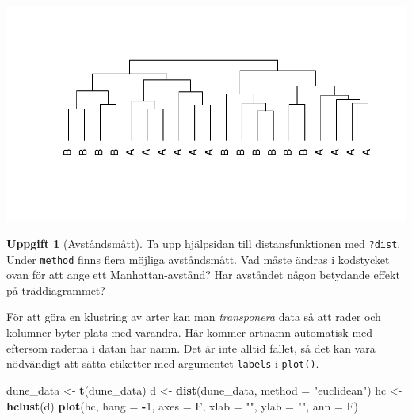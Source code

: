 \documentclass[
]{book}
\newenvironment{Shaded}{\begin{snugshade}}{\end{snugshade}}
\newcommand{\AttributeTok}[1]{\textcolor[rgb]{0.13,0.29,0.53}{#1}}
\newcommand{\DecValTok}[1]{\textcolor[rgb]{0.00,0.00,0.81}{#1}}
\newcommand{\FunctionTok}[1]{\textcolor[rgb]{0.13,0.29,0.53}{\textbf{#1}}}
\newcommand{\NormalTok}[1]{#1}
\newcommand{\OtherTok}[1]{\textcolor[rgb]{0.56,0.35,0.01}{#1}}
\newcommand{\SpecialCharTok}[1]{\textcolor[rgb]{0.81,0.36,0.00}{\textbf{#1}}}
\newcommand{\StringTok}[1]{\textcolor[rgb]{0.31,0.60,0.02}{#1}}
\theoremstyle{definition}
\theoremstyle{definition}
\theoremstyle{definition}
\newtheorem{exercise}{Uppgift}[chapter]
\theoremstyle{definition}
\theoremstyle{remark}
\begin{document}
\begin{center}\includegraphics{R-anvisningar_files/figure-latex/unnamed-chunk-253-1} \end{center}

\begin{exercise}[Avståndsmått]
Ta upp hjälpsidan till distansfunktionen med \texttt{?dist}. Under \texttt{method} finns flera möjliga avståndsmått. Vad måste ändras i kodstycket ovan för att ange ett Manhattan-avstånd? Har avståndet någon betydande effekt på träddiagrammet?
\end{exercise}

För att göra en klustring av arter kan man \emph{transponera} data så att rader och kolumner byter plats med varandra. Här kommer artnamn automatisk med eftersom raderna i datan har namn. Det är inte alltid fallet, så det kan vara nödvändigt att sätta etiketter med argumentet \texttt{labels} i \texttt{plot()}.

\begin{Shaded}
\begin{Highlighting}[]
\NormalTok{dune\_data }\OtherTok{\textless{}{-}} \FunctionTok{t}\NormalTok{(dune\_data)}
\NormalTok{d }\OtherTok{\textless{}{-}} \FunctionTok{dist}\NormalTok{(dune\_data, }\AttributeTok{method =} \StringTok{"euclidean"}\NormalTok{)}
\NormalTok{hc }\OtherTok{\textless{}{-}} \FunctionTok{hclust}\NormalTok{(d)}
\FunctionTok{plot}\NormalTok{(hc, }\AttributeTok{hang =} \SpecialCharTok{{-}}\DecValTok{1}\NormalTok{,}
     \AttributeTok{axes =}\NormalTok{ F, }\AttributeTok{xlab =} \StringTok{""}\NormalTok{, }\AttributeTok{ylab =} \StringTok{""}\NormalTok{, }\AttributeTok{ann =}\NormalTok{ F)}
\end{Highlighting}
\end{Shaded}
\end{document}
